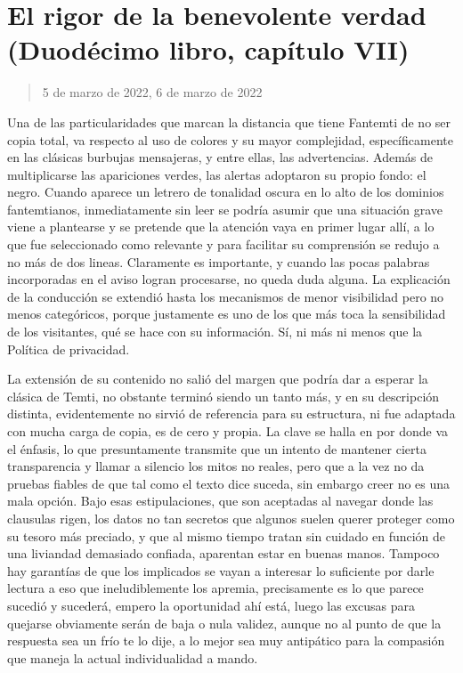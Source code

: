\documentclass[
]{book}
\begin{document}
\hypertarget{el-rigor-de-la-benevolente-verdad-duoduxe9cimo-libro-capuxedtulo-vii}{%
\section{El rigor de la benevolente verdad (Duodécimo libro, capítulo VII)}\label{el-rigor-de-la-benevolente-verdad-duoduxe9cimo-libro-capuxedtulo-vii}}

\begin{quote}
5 de marzo de 2022, 6 de marzo de 2022
\end{quote}

Una de las particularidades que marcan la distancia que tiene Fantemti de no ser copia total, va respecto al uso de colores y su mayor complejidad, específicamente en las clásicas burbujas mensajeras, y entre ellas, las advertencias. Además de multiplicarse las apariciones verdes, las alertas adoptaron su propio fondo: el negro. Cuando aparece un letrero de tonalidad oscura en lo alto de los dominios fantemtianos, inmediatamente sin leer se podría asumir que una situación grave viene a plantearse y se pretende que la atención vaya en primer lugar allí, a lo que fue seleccionado como relevante y para facilitar su comprensión se redujo a no más de dos lineas. Claramente es importante, y cuando las pocas palabras incorporadas en el aviso logran procesarse, no queda duda alguna. La explicación de la conducción se extendió hasta los mecanismos de menor visibilidad pero no menos categóricos, porque justamente es uno de los que más toca la sensibilidad de los visitantes, qué se hace con su información. Sí, ni más ni menos que la Política de privacidad.

La extensión de su contenido no salió del margen que podría dar a esperar la clásica de Temti, no obstante terminó siendo un tanto más, y en su descripción distinta, evidentemente no sirvió de referencia para su estructura, ni fue adaptada con mucha carga de copia, es de cero y propia. La clave se halla en por donde va el énfasis, lo que presuntamente transmite que un intento de mantener cierta transparencia y llamar a silencio los mitos no reales, pero que a la vez no da pruebas fiables de que tal como el texto dice suceda, sin embargo creer no es una mala opción. Bajo esas estipulaciones, que son aceptadas al navegar donde las clausulas rigen, los datos no tan secretos que algunos suelen querer proteger como su tesoro más preciado, y que al mismo tiempo tratan sin cuidado en función de una liviandad demasiado confiada, aparentan estar en buenas manos. Tampoco hay garantías de que los implicados se vayan a interesar lo suficiente por darle lectura a eso que ineludiblemente los apremia, precisamente es lo que parece sucedió y sucederá, empero la oportunidad ahí está, luego las excusas para quejarse obviamente serán de baja o nula validez, aunque no al punto de que la respuesta sea un frío te lo dije, a lo mejor sea muy antipático para la compasión que maneja la actual individualidad a mando.
\end{document}
